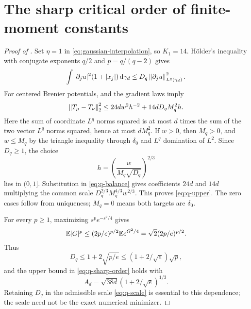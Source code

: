 \documentclass[11pt]{article}
\numberwithin{equation}{section}
\theoremstyle{remark}\newtheorem{remark}[theorem]{Remark}
\begin{document}
\section{The sharp critical order of finite-moment constants}\label{sec:q}
\begin{proof}[Proof of ]
Set $\eta=1$ in \eqref{eq:gaussian-interpolation}, so $K_1=14$. H\"older's inequality with conjugate exponents $q/2$ and $p=q/(q-2)$ gives
\[
 \int|\partial_j u|^2(1+|x_j|)\,\mathrm d\gamma_d
 \le D_q\left\lVert\partial_j u\right\rVert_{L^q(\gamma_d)}^2.
\]
For centered Brenier potentials,  and the gradient laws imply
\begin{equation}\label{eq:q-balance}
 \left\lVert T_\mu-T_\nu\right\rVert_2^2
 \le24d w^2h^{-2}+14dD_qM_q^2h.
\end{equation}
Here the sum of coordinate $L^q$ norms squared is at most $d$ times the sum of the two vector $L^q$ norms squared, hence at most $dM_q^2$.
If $w>0$, then $M_q>0$, and $w\le M_q$ by the triangle inequality through $\delta_0$ and $L^q$ domination of $L^2$. Since $D_q\ge1$, the choice
\begin{equation}\label{eq:q-scale}
 h=\left(\frac{w}{M_q\sqrt{D_q}}\right)^{2/3}
\end{equation}
lies in $(0,1]$. Substitution in \eqref{eq:q-balance} gives coefficients $24d$ and $14d$ multiplying the common scale $D_q^{2/3}M_q^{4/3}w^{2/3}$. This proves \eqref{eq:q-upper}. The zero cases follow from uniqueness; $M_q=0$ means both targets are $\delta_0$.

For every $p\ge1$, maximizing $s^pe^{-s^2/4}$ gives
\[
 \mathbb E|G|^p\le(2p/e)^{p/2}\mathbb E e^{G^2/4}
 =\sqrt2(2p/e)^{p/2}.
\]
Thus
\[
 D_q\le1+2\sqrt{p/e}\le(1+2/\sqrt e)\sqrt p,
\]
and the upper bound in \eqref{eq:q-sharp-order} holds with
\begin{equation}\label{eq:q-Ad}
 A_d=\sqrt{38d}(1+2/\sqrt e)^{1/3}.
\end{equation}
Retaining $D_q$ in the admissible scale \eqref{eq:q-scale} is essential to this dependence; the scale need not be the exact numerical minimizer.


\end{proof}
\end{document}
